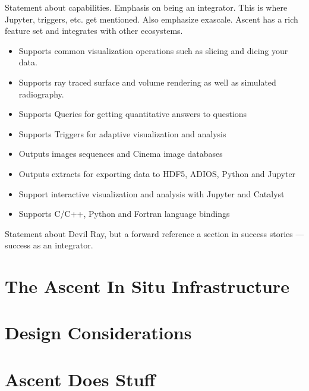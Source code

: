 Statement about capabilities.  Emphasis on being an integrator.
This is where Jupyter, triggers, etc. get mentioned.  Also emphasize
exascale.
Ascent has a rich feature set and integrates with other ecosystems.

\begin{itemize}
  \item Supports common visualization operations such as slicing and dicing your data.
  \item Supports ray traced surface and volume rendering as well as simulated radiography.
  \item Supports Queries for getting quantitative answers to questions
  \item Supports Triggers for adaptive visualization and analysis
  \item Outputs images sequences and Cinema image databases
  \item Outputs extracts for exporting data to HDF5, ADIOS, Python and Jupyter
  \item Support interactive visualization and analysis with Jupyter and Catalyst
  \item Supports C/C++, Python and Fortran language bindings
\end{itemize}

Statement about Devil Ray, but a forward reference a section in success stories --- success as an integrator.



\section{The Ascent In Situ Infrastructure}
\label{ascent_overview}


\section{Design Considerations}
\label{ascent_design_considerations}


\section{Ascent Does Stuff}
\label{ascent_does_stuff}


